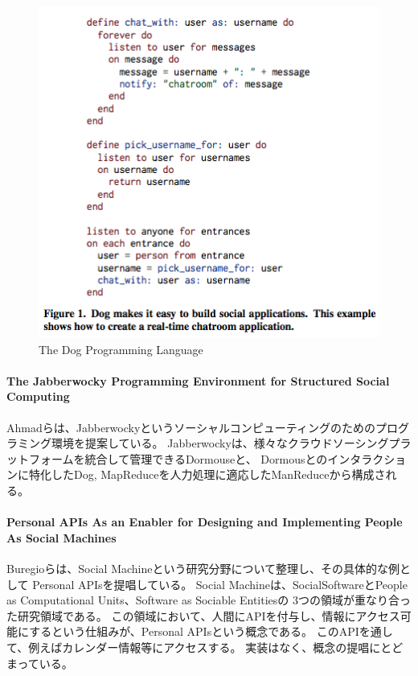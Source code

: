 \begin{figure}[htbp]
  \begin{center}
  \includegraphics[width=.6\linewidth,bb=0 0 426 414]{images/dog.png}
  \end{center}
  \caption{The Dog Programming Language}
  \label{fig:dog}
\end{figure}

\paragraph{The Jabberwocky Programming Environment for Structured Social
Computing}\label{the-jabberwocky-programming-environment-for-structured-social-computing}

\mbox{}

Ahmadらは、Jabberwockyというソーシャルコンピューティングのためのプログラミング環境を提案している\cite{jabberwocky}。
Jabberwockyは、様々なクラウドソーシングプラットフォームを統合して管理できるDormouseと、
Dormousとのインタラクションに特化したDog,
MapReduceを人力処理に適応したManReduceから構成される。

\paragraph{Personal APIs As an Enabler for Designing and Implementing
People As Social
Machines}\label{personal-apis-as-an-enabler-for-designing-and-implementing-people-as-social-machines}

\mbox{}

Buregioらは、Social
Machine\cite{social-machines}という研究分野について整理し、その具体的な例として
Personal APIs\cite{personal-api}を提唱している。 Social
Machineは、SocialSoftwareとPeople as Computational Units、Software as
Sociable Entitiesの 3つの領域が重なり合った研究領域である。
この領域において、人間にAPIを付与し、情報にアクセス可能にするという仕組みが、Personal
APIsという概念である。
このAPIを通して、例えばカレンダー情報等にアクセスする。
実装はなく、概念の提唱にとどまっている。

